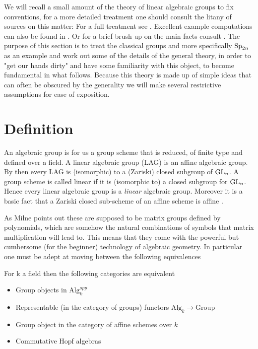 We will recall a small amount of the theory of linear algebraic groups to fix conventions, for a more detailed treatment one should consult the litany of sources on this matter: For a full treatment see \cite{milneAlgebraicGroupsTheory2017}\cite{milneLieAlgebrasAlgebraic}\cite{milneBasicTheoryAffine}\cite{springerLinearAlgebraicGroups1998}. Excellent example computations can also be found in \cite{BuildingsClassicalGroups}\cite{makisumiStructureTheoryReductive}\cite{malleLinearAlgebraicGroups}\cite{NotesClassAlgebraic}. Or for a brief brush up on the main facts consult \cite[I.I.1]{borelAutomorphicFormsRepresentations1979}. The purpose of this section is to treat the classical groups and more specifically \(\operatorname{Sp}_{2n}\) as an example and work out some of the details of the general theory, in order to "get our hands dirty" and have some familiarity with this object, to become fundamental in what follows. Because this theory is made up of simple ideas that can often be obscured by the generality we will make several restrictive assumptions for ease of exposition. 

\section{Definition}
An algebraic group is for us a group scheme that is reduced, of finite type and defined over a field. A linear algebraic group (LAG) is an affine algebraic group.
By \cite[2.3.7(i)]{springerLinearAlgebraicGroups1998} then every LAG is (isomorphic) to a (Zariski) closed subgroup of \(\operatorname{GL}_n\). A group scheme is called linear if it is (isomorphic to) a closed subgroup for \(\operatorname{GL}_n\). Hence every linear algebraic group is a \textit{linear} algebraic group. Moreover it is a basic fact that a Zariski closed sub-scheme of an affine scheme is affine \cite[II.5.T3]{mumfordRedBookVarieties1999}.

As Milne points out \cite[Abstract]{milneAlgebraicGroupsTheory2017} these are supposed to be matrix groups defined by polynomials, which are somehow the natural combinations of symbols that matrix multiplication will lead to. This means that they come with the powerful but cumbersome (for the beginner) technology of algebraic geometry. In particular one must be adept at moving between the following equivalences
\begin{Theorem}
    For k a field then the following categories are equivalent
    \begin{itemize}
        \item Group objects in \(\mathrm{Alg}_k^{opp}\)
        \item Representable (in the category of groups) functors \(\mathrm{Alg}_k \to \mathrm{Group}\)
        \item Group object in the category of affine schemes over \(k\)
        \item Commutative Hopf algebras
    \end{itemize}
\end{Theorem}

